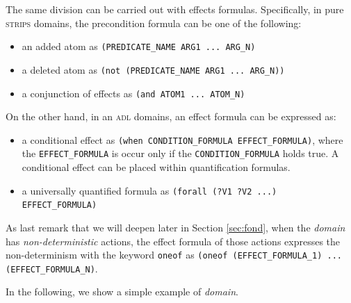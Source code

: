 The same division can be carried out with effects formulas. Specifically, in pure \textsc{strips} domains, the precondition formula can be one of the following:
\begin{itemize}
\item an added atom as \texttt{(PREDICATE\_NAME ARG1 ... ARG\_N)}
\item a deleted atom as \texttt{(not (PREDICATE\_NAME ARG1 ... ARG\_N))}
\item a conjunction of effects as \texttt{(and ATOM1 ... ATOM\_N)}
\end{itemize}
On the other hand, in an \textsc{adl} domains, an effect formula can be expressed as:
\begin{itemize}
\item a conditional effect as \texttt{(when CONDITION\_FORMULA EFFECT\_FORMULA)}, where the \texttt{EFFECT\_FORMULA} is occur only if the \texttt{CONDITION\_FORMULA} holds true. A conditional effect can be placed within quantification formulas.
\item a universally quantified formula as \texttt{(forall (?V1 ?V2 ...) EFFECT\_FORMULA)}
\end{itemize}

As last remark that we will deepen later in Section \ref{sec:fond}, when the \PDDL \textit{domain} has \textit{non-deterministic} actions, the effect formula of those actions expresses the non-determinism with the keyword \texttt{oneof} as \texttt{(oneof (EFFECT\_FORMULA\_1) ... \\ (EFFECT\_FORMULA\_N)}.

In the following, we show a simple example of \PDDL \textit{domain}.

